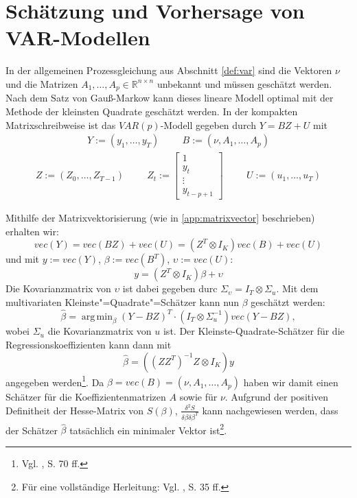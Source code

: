 \documentclass[
	a4paper,
	12pt,
	bibliography=totocnumbered,
	twoside,
]{scrreprt}
\DeclareMathOperator*{\argmin}{arg\,min}												%
\begin{document}
\section{Schätzung und Vorhersage von VAR-Modellen}
\label{sec:var-estimation}
In der allgemeinen Prozessgleichung aus Abschnitt \ref{def:var} sind die Vektoren $\nu$ und die Matrizen $A_1, \ldots, A_p \in \mathbb{R}^{n \times n}$ unbekannt und müssen geschätzt werden. Nach dem Satz von Gauß-Markow kann dieses lineare Modell optimal mit der Methode der kleinsten Quadrate geschätzt werden. In der kompakten Matrixschreibweise ist das $VAR(p)$-Modell gegeben durch $Y = B Z + U$ mit
\begin{align*}
    Y := (y_1, \ldots , y_T) \hspace{1cm} B := (\nu , A_1, \ldots, A_p)
\end{align*}
\begin{align}
    Z := (Z_{0}, \ldots, Z_{T-1})  \hspace{1cm}  Z_t := \begin{bmatrix} 1 \\ y_{t} \\ \vdots \\ y_{t-p+1} \end{bmatrix} \hspace{1cm} U := (u_{1}, \ldots, u_{T})
\end{align}

Mithilfe der Matrixvektorisierung (wie in \ref{app:matrixvector} beschrieben) erhalten wir:
\begin{equation}
    vec(Y) = vec(BZ) + vec(U) = (Z^T \otimes I_K) vec(B) + vec(U)
\end{equation}
und mit $y:=vec(Y)$, $\beta:=vec(B^T)$, $\upsilon:=vec(U)$:
\begin{equation}
    y = (Z^T \otimes I_K) \beta + \upsilon
\end{equation}
Die Kovarianzmatrix von $\upsilon$ ist dabei gegeben durc $\Sigma_\upsilon = I_T \otimes \Sigma_u$.
Mit dem multivariaten Kleinste"=Quadrate"=Schätzer kann nun $\beta$ geschätzt werden:
\begin{equation}
    \hat{\beta} = \argmin_{\beta} (Y-BZ)^T \cdot (I_T \otimes \Sigma_u^{-1}) vec(Y-BZ),
\end{equation}
wobei $\Sigma_u$ die Kovarianzmatrix von $u$ ist.
Der Kleinste-Quadrate-Schätzer für die Regressionskoeffizienten kann dann mit
\begin{equation}
    \hat{\beta} = ((Z Z^T)^{-1}Z \otimes I_K) y
\end{equation}
angegeben werden\footnote{Vgl. \citet{luetkepohl2005}, S. 70 ff.}. Da $\beta = vec(B) = (\nu, A_1, \ldots, A_p)$ haben wir damit einen Schätzer für die Koeffizientenmatrizen $A$ sowie für $\nu$. Aufgrund der positiven Definitheit der Hesse-Matrix von $S(\beta)$, $\frac{\delta^2 S}{\delta \beta \delta \beta^T}$ kann nachgewiesen werden, dass der Schätzer $\hat{\beta}$ tatsächlich ein minimaler Vektor ist\footnote{Für eine vollständige Herleitung: Vgl. \cite{luetkepohl2005}, S. 35 ff.}.\\
\end{document}
